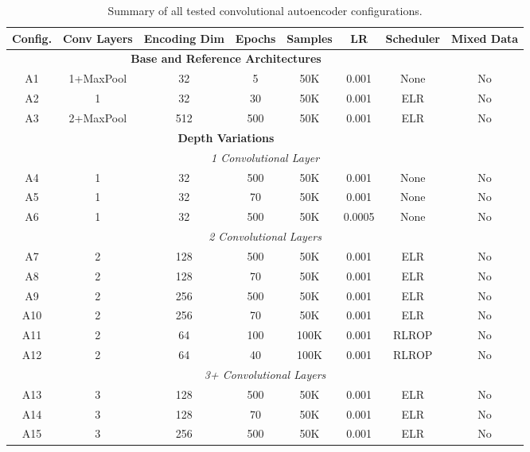     \begin{table}[htbp]
    \centering
    \caption{Summary of all tested convolutional autoencoder configurations.}
    \label{tab:autoencoder_configs}
    \vspace{3mm}
    \scriptsize
    \renewcommand{\arraystretch}{1.15}
    \begin{tabular}{|c|c|c|c|c|c|c|c|}
    \hline
    \textbf{Config.} & \textbf{Conv Layers} & \textbf{Encoding Dim} & \textbf{Epochs} & \textbf{Samples} & \textbf{LR} & \textbf{Scheduler} & \textbf{Mixed Data} \\
    \hline
    \hline
    \multicolumn{7}{|c|}{\textbf{Base and Reference Architectures}} \\
    \hline
    A1 & 1+MaxPool & 32 & 5 & 50K & 0.001 & None & No \\
    A2 & 1 & 32 & 30 & 50K & 0.001 & ELR & No \\
    A3 & 2+MaxPool & 512 & 500 & 50K & 0.001 & ELR & No \\
    \hline
    \hline
    \multicolumn{7}{|c|}{\textbf{Depth Variations}} \\
    \hline
    \multicolumn{8}{|c|}{\textit{1 Convolutional Layer}} \\
    \hline
    A4 & 1 & 32 & 500 & 50K & 0.001 & None & No \\
    A5 & 1 & 32 & 70 & 50K & 0.001 & None & No \\
    A6 & 1 & 32 & 500 & 50K & 0.0005 & None & No \\
    \hline
    \multicolumn{8}{|c|}{\textit{2 Convolutional Layers}} \\
    \hline
    A7 & 2 & 128 & 500 & 50K & 0.001 & ELR & No \\
    A8 & 2 & 128 & 70 & 50K & 0.001 & ELR & No \\
    A9 & 2 & 256 & 500 & 50K & 0.001 & ELR & No \\
    A10 & 2 & 256 & 70 & 50K & 0.001 & ELR & No \\
    A11 & 2 & 64 & 100 & 100K & 0.001 & RLROP & No \\
    A12 & 2 & 64 & 40 & 100K & 0.001 & RLROP & No \\
    \hline
    \multicolumn{8}{|c|}{\textit{3+ Convolutional Layers}} \\
    \hline
    A13 & 3 & 128 & 500 & 50K & 0.001 & ELR & No \\
    A14 & 3 & 128 & 70 & 50K & 0.001 & ELR & No \\
    A15 & 3 & 256 & 500 & 50K & 0.001 & ELR & No \\

\end{tabular}
\end{table}

